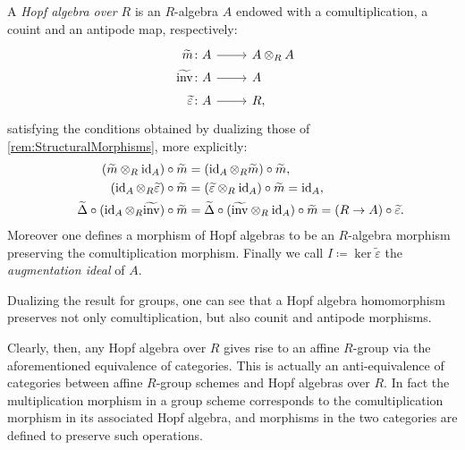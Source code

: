 \begin{defn}\label{defn:HopfAlgebra}
	A \emph{Hopf algebra over $R$} is an $R$-algebra $A$
	endowed with a comultiplication, a couint and an antipode map,
	respectively:
	\begin{equation*}
			\begin{tikzcd}[row sep = 0ex
         ,/tikz/column 1/.append style={anchor=base east}
         ,/tikz/column 2/.append style={anchor=base west}
         ,/tikz/column 3/.append style={anchor=base east}]
			\widetilde{m}\colon A \arrow[r, "", rightarrow] &
			A \otimes_R A \\
			\widetilde{\mathrm{inv}}\colon A \arrow[r, "", rightarrow] &
			A \phantom{\otimes_R} \\
			\phantom{\widetilde{\operatorname{inv}}}\widetilde{\varepsilon} \colon A
			\arrow[r, "", rightarrow] &
			R,
		\end{tikzcd}
	\end{equation*} 
	satisfying the conditions obtained by dualizing those
	of \cref{rem:StructuralMorphisms}, more explicitly:
	\begin{align*}
		( \widetilde{m} \otimes_R \id_{ A } ) \circ \widetilde{m} &=
		( \id_{ A } \otimes_R \widetilde{m} ) \circ \widetilde{m},\\
		( \id_{ A } \otimes_R \widetilde{\varepsilon} ) \circ \widetilde{m} &=
		( \widetilde{\varepsilon} \otimes_R \id_{ A } ) \circ \widetilde{m} =
		\id_{ A },\\
		\phantom{\widetilde{\operatorname{inv}}}
		\widetilde{\Delta} \circ ( \id_{ A } \otimes_R \widetilde{\mathrm{inv}} ) 
		\circ \widetilde{m} &=
		\widetilde{\Delta} \circ ( \widetilde{\mathrm{inv}} \otimes_R \id_{ A } ) 
		\circ \widetilde{m} =
		(R \to A) \circ \widetilde{\varepsilon}
	.\end{align*} 
	Moreover one defines a morphism of Hopf algebras to be an $R$-algebra
	morphism preserving the comultiplication morphism.
	Finally we call $I \coloneqq \ker \widetilde{\varepsilon}$ the 
	\emph{augmentation ideal} of $A$.
\end{defn}


\begin{rem}[]
	Dualizing the result for groups, one can see that a Hopf algebra
	homomorphism preserves not only comultiplication, but also
	counit and antipode morphisms.
\end{rem}


\begin{rem}
	Clearly, then, any Hopf algebra over $R$ gives rise
	to an affine $R$-group via the aforementioned equivalence of categories.
	This is actually an anti-equivalence of categories between affine
	$R$-group schemes and Hopf algebras over $R$.
	In fact	the multiplication morphism in a group scheme
	corresponds to the comultiplication morphism in its 
	associated Hopf algebra, and morphisms in the two categories are defined
	to preserve such operations.
\end{rem}


